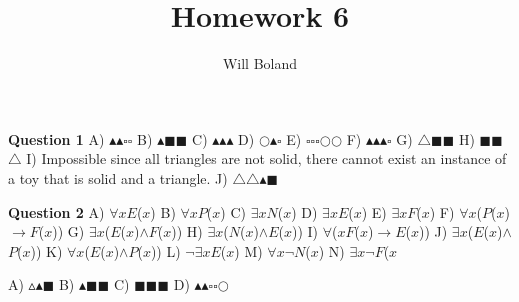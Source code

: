 \documentclass{article}
\begin{document}
\title{Homework 6}
\author{Will Boland}
\maketitle

\textbf{Question 1}\newline
A)	$\blacktriangle$$\blacktriangle$$\square$$\square$\newline
B)	$\blacktriangle$$\blacksquare$$\blacksquare$\newline
C)	$\blacktriangle$$\blacktriangle$$\blacktriangle$\newline
D)	$\mathbb{\bigcirc}$$\blacktriangle$$\square$\newline
E)	$\square$$\square$$\square$$\mathbb{\bigcirc}$$\mathbb{\bigcirc}$\newline
F)	$\blacktriangle$$\blacktriangle$$\blacktriangle$$\square$\newline
G)	$\triangle$$\blacksquare$$\blacksquare$\newline
H)	$\blacksquare$$\blacksquare$$\triangle$\newline
I)	Impossible since all triangles are not solid, there cannot exist an instance of a toy that is solid and a triangle.\newline
J)	$\triangle$$\triangle$$\blacktriangle$$\blacksquare$\newline\newline

\textbf{Question 2}\newline
A)	$\forall$$x$$E$($x$)\newline
B)	$\forall$$x$$P$($x$)\newline
C)	$\exists$$x$$N$($x$)\newline
D)	$\exists$$x$$E$($x$)\newline
E)	$\exists$$x$$F$($x$)\newline
F)	$\forall$$x$($P$($x$)$\rightarrow$$F$($x$))\newline
G)	$\exists$$x$($E$($x$)$\wedge$$F$($x$))\newline
H)	$\exists$$x$($N$($x$)$\wedge$$E$($x$))\newline
I)	$\forall$($x$$F$($x$)$\rightarrow$$E$($x$))\newline
J)	$\exists$$x$($E$($x$)$\wedge$$P$($x$))\newline
K)	$\forall$$x$($E$($x$)$\wedge$$P$($x$))\newline
L)	$\neg$$\exists$$x$$E$($x$)\newline
M)	$\forall$$x$$\neg$$N$($x$)\newline
N)	$\exists$$x$$\neg$$F$($x$

\enddocument








A)	$\vartriangle$$\blacktriangle$$\blacksquare$\newline
B)	$\blacktriangle$$\blacksquare$$\blacksquare$\newline
C)	$\blacksquare$$\blacksquare$$\blacksquare$\newline
D)	$\blacktriangle$$\blacktriangle$$\square$$\square$$\mathbb{\bigcirc}$
\end{document}
